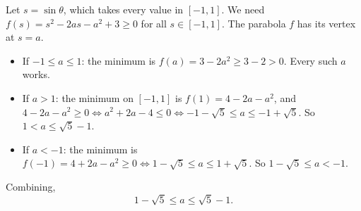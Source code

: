 Let \(s=\sin\theta\), which takes every value in \([-1,1]\). We need \(f(s)=s^2-2as-a^2+3\ge 0\) for all \(s\in[-1,1]\). The parabola \(f\) has its vertex at \(s=a\).
\begin{itemize}
\item If \(-1\le a\le 1\): the minimum is \(f(a)=3-2a^2\ge 3-2>0\). Every such \(a\) works.
\item If \(a>1\): the minimum on \([-1,1]\) is \(f(1)=4-2a-a^2\), and \(4-2a-a^2\ge 0\iff a^2+2a-4\le 0\iff -1-\sqrt5\le a\le -1+\sqrt5\). So \(1<a\le\sqrt5-1\).
\item If \(a<-1\): the minimum is \(f(-1)=4+2a-a^2\ge 0\iff 1-\sqrt5\le a\le 1+\sqrt5\). So \(1-\sqrt5\le a<-1\).
\end{itemize}
Combining,
\[
\boxed{1-\sqrt5\le a\le \sqrt5-1}.
\]
